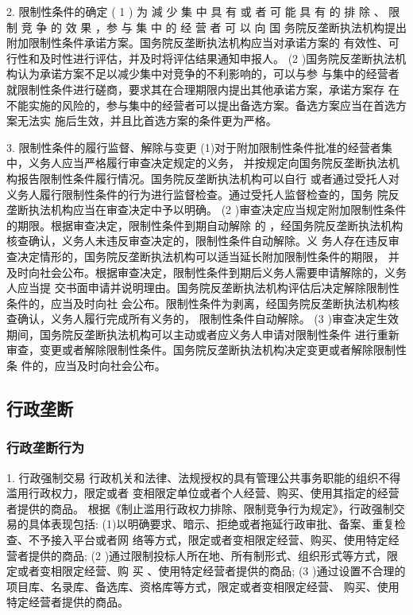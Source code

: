 \documentclass[UTF8,12pt]{ctexart}
\numberwithin{equation}{section} %
\numberwithin{figure}{section}
\numberwithin{table}{section}
\begin{document}
	2. 限制性条件的确定
	( 1 ) 为 減 少 集 中 具 有 或 者 可 能 具 有 的 排 除 、 限 制 竞 争 的 效 果 ，参 与 集 中 的 经 营 者 可 以 向 国 务院反垄断执法机构提出附加限制性条件承诺方案。国务院反垄断执法机构应当对承诺方案的 有效性、可行性和及时性进行评估，并及时将评估结果通知申报人。
	(2 )国务院反垄断执法机构认为承诺方案不足以减少集中对竞争的不利影响的，可以与参 与集中的经营者就限制性条件进行磋商，要求其在合理期限内提出其他承诺方案，承诺方案存 在不能实施的风险的，参与集中的经营者可以提出备选方案。备选方案应当在首选方案无法实 施后生效，并且比首选方案的条件更为严格。
	
	3. 限制性条件的履行监督、解除与变更 (1)对于附加限制性条件批准的经营者集中，义务人应当严格履行审查决定规定的义务， 并按规定向国务院反垄断执法机构报告限制性条件履行情况。国务院反垄断执法机构可以自行 或者通过受托人对义务人履行限制性条件的行为进行监督检查。通过受托人监督检查的，国务 院反垄断执法机构应当在审查决定中予以明确。
	(2 )审查决定应当规定附加限制性条件的期限。根据审查决定，限制性条件到期自动解除 的 ，经国务院反垄断执法机构核查确认，义务人未违反审查决定的，限制性条件自动解除。义 务人存在违反审查决定情形的，国务院反垄断执法机构可以适当延长附加限制性条件的期限， 并及时向社会公布。根据审查决定，限制性条件到期后义务人需要申请解除的，义务人应当提 交书面申请并说明理由。国务院反垄断执法机构评估后决定解除限制性条件的，应当及时向社 会公布。限制性条件为剥离，经国务院反垄断执法机构核查确认，义务人履行完成所有义务的， 限制性条件自动解除。
	(3 )审查决定生效期间，国务院反垄断执法机构可以主动或者应义务人申请对限制性条件 进行重新审查，变更或者解除限制性条件。国务院反垄断执法机构决定变更或者解除限制性条 件的，应当及时向社会公布。
	
	\subsection{行政垄断}
	
	\subsubsection{行政垄断行为}
	1. 行政强制交易 行政机关和法律、法规授权的具有管理公共事务职能的组织不得滥用行政权力，限定或者 变相限定单位或者个人经营、购买、使用其指定的经营者提供的商品。 根据《制止滥用行政权力排除、限制竞争行为规定》，行政强制交易的具体表现包括: 
	(1)以明确要求、暗示、拒绝或者拖延行政审批、备案、重复检查、不予接入平台或者网 络等方式，限定或者变相限定经营、购买、使用特定经营者提供的商品;
	(2 )通过限制投标人所在地、所有制形式、组织形式等方式，限定或者变相限定经营、购 买 、使用特定经营者提供的商品;
	(3 )通过设置不合理的项目库、名录库、备选库、资格库等方式，限定或者变相限定经营、 购买、使用特定经营者提供的商品。
	
\end{document}
